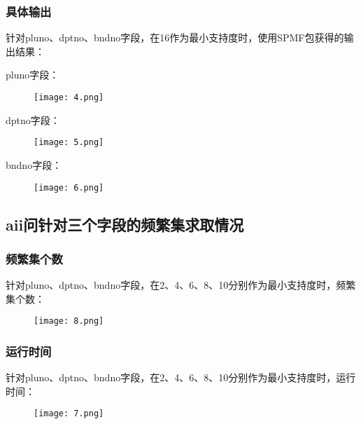 \documentclass{article}
\begin{document}
\begin{CJK}{UTF8}{gbsn}
\subsubsection{具体输出}
针对pluno、dptno、bndno字段，在16作为最小支持度时，使用SPMF包获得的输出结果：

pluno字段：
\begin{figure}[!h]
\begin{center}
  \texttt{[image: 4.png]}	
\end{center}
\end{figure}

dptno字段：
\begin{figure}[!h]
\begin{center}
  \texttt{[image: 5.png]}	
\end{center}
\end{figure}

bndno字段：
\begin{figure}[!h]
\begin{center}
  \texttt{[image: 6.png]}	
\end{center}
\end{figure}

\clearpage

\subsection{aii问针对三个字段的频繁集求取情况}
\subsubsection{频繁集个数}
针对pluno、dptno、bndno字段，在2、4、6、8、10分别作为最小支持度时，频繁集个数：

\begin{figure}[!h]
\begin{center}
  \texttt{[image: 8.png]}	
\end{center}
\end{figure}


\subsubsection{运行时间}
针对pluno、dptno、bndno字段，在2、4、6、8、10分别作为最小支持度时，运行时间：
\begin{figure}[!h]
\begin{center}
  \texttt{[image: 7.png]}	
\end{center}
\end{figure}


\end{CJK}
\end{document}
